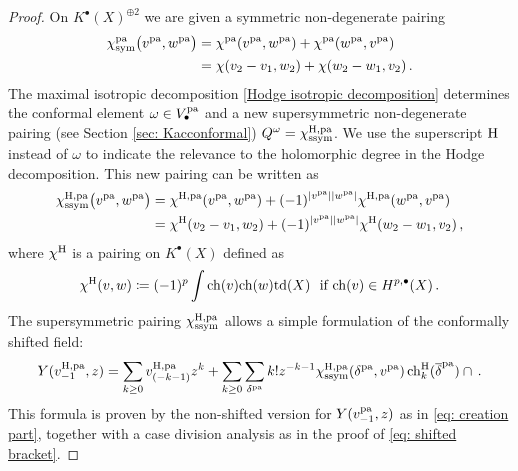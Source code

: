 \documentclass[a4paper, 12pt]{amsart}
\begin{document}
\begin{proof}
On $K^\bullet(X)^{\oplus 2}$ we are given a symmetric non-degenerate pairing
\begin{align*}
    \chi^{\mathop{\rm pa}\nolimits}_{\text{sym}}\big(v^{\mathop{\rm pa}\nolimits},w^{\mathop{\rm pa}\nolimits}\big)&=\chi^{\mathop{\rm pa}\nolimits}(v^{\mathop{\rm pa}\nolimits},w^{\mathop{\rm pa}\nolimits})+\chi^{\mathop{\rm pa}\nolimits}(w^{\mathop{\rm pa}\nolimits},v^{\mathop{\rm pa}\nolimits})\\
    &=\chi(v_2-v_1,w_2)+\chi(w_2-w_1,v_2)\,.
\end{align*}
The maximal isotropic decomposition \eqref{Hodge isotropic decomposition} determines the conformal element $\omega\in V^{\mathop{\rm pa}\nolimits}_\bullet$ and a new supersymmetric non-degenerate pairing (see Section \ref{sec: Kacconformal}) $Q^\omega=\chi^{\mathrm{H},\mathop{\rm pa}\nolimits}_{\text{ssym}}$. We use the superscript $\mathrm{H}$ instead of $\omega$ to indicate the relevance to the holomorphic degree in the Hodge decomposition. This new pairing can be written as
\begin{align*}
    \chi^{\mathrm{H},\mathop{\rm pa}\nolimits}_{\text{ssym}}\big(v^{\mathop{\rm pa}\nolimits},w^{\mathop{\rm pa}\nolimits}\big)&=\chi^{\mathrm{H},\mathop{\rm pa}\nolimits}(v^{\mathop{\rm pa}\nolimits},w^{\mathop{\rm pa}\nolimits})+(-1)^{|v^{\mathop{\rm pa}\nolimits}||w^{\mathop{\rm pa}\nolimits}|}\chi^{\mathrm{H},\mathop{\rm pa}\nolimits}(w^{\mathop{\rm pa}\nolimits},v^{\mathop{\rm pa}\nolimits})\\
    &=\chi^{\mathrm{H}}(v_2-v_1,w_2)+(-1)^{|v^{\mathop{\rm pa}\nolimits}||w^{\mathop{\rm pa}\nolimits}|}\chi^{\mathrm{H}}(w_2-w_1,v_2)\,,
\end{align*}
where $\chi^{\mathrm{H}}$ is a pairing on $K^\bullet(X)$ defined as
$$\chi^{\mathrm{H}}(v,w)\coloneqq (-1)^p\int \mathrm{ch}(v)\mathrm{ch}(w)\mathrm{td}(X)\ \ \textnormal{if}\ \mathrm{ch}(v)\in H^{p,\bullet}(X)\,.
$$
The supersymmetric pairing $\chi^{\mathrm{H},\mathop{\rm pa}\nolimits}_{\text{ssym}}$ allows a simple formulation of the conformally shifted field:
\begin{equation}\label{eq: shifted field}
    Y(v_{-1}^{\mathrm{H},\mathop{\rm pa}\nolimits},z)
    =\sum_{k\geq 0} v^{\mathrm{H},\mathop{\rm pa}\nolimits}_{(-k-1)}z^k+\sum_{k\geq 0}\sum_{\delta^{\mathop{\rm pa}\nolimits}}k!z^{-k-1}\chi^{\mathrm{H},\mathop{\rm pa}\nolimits}_{\text{ssym}}(\delta^{\mathop{\rm pa}\nolimits},v^{\mathop{\rm pa}\nolimits})\,\mathrm{ch}_{k}^{\mathrm{H}}(\overline{\delta}^{\mathop{\rm pa}\nolimits})\cap\,.
\end{equation}
This formula is proven by the non-shifted version for $Y(v_{-1}^{\mathop{\rm pa}\nolimits},z)$ as in \eqref{eq: creation part}, together with a case division analysis as in the proof of \eqref{eq: shifted bracket}. 


\end{proof}
\end{document}

